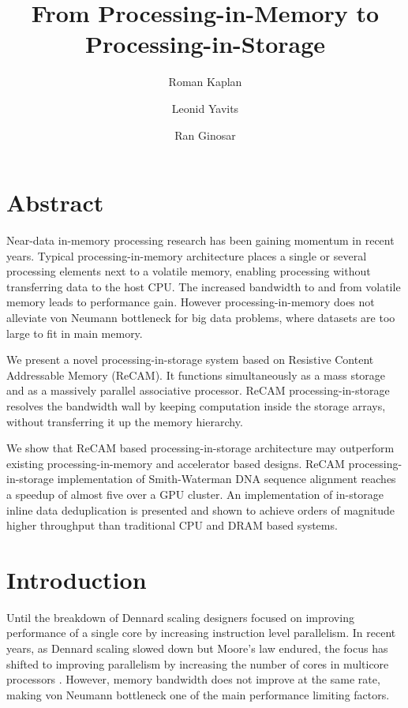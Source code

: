 \documentclass{superfri}
\begin{document}
	
	\title{From Processing-in-Memory to Processing-in-Storage}
	
	\author{Roman Kaplan\footnotemark \and Leonid Yavits\footnotemark[\value{footnote}] \and Ran Ginosar\footnotemark[\value{footnote}]}
	
	
	
	\maketitle{}
	
	\begin{abstract}
		
	\end{abstract}
	
	\section*{Abstract}
	\label{sec:abstract}
	Near-data in-memory processing research has been gaining momentum in recent years. Typical processing-in-memory architecture places a single or several processing elements next to a volatile memory, enabling processing without transferring data to the host CPU. The increased bandwidth to and from volatile memory leads to performance gain. However processing-in-memory does not alleviate von Neumann bottleneck for big data problems, where datasets are too large to fit in main memory. 
	
	We present a novel processing-in-storage system based on Resistive Content Addressable Memory (ReCAM). It functions simultaneously as a mass storage and as a massively parallel associative processor. ReCAM processing-in-storage resolves the bandwidth wall by keeping computation inside the storage arrays, without transferring it up the memory hierarchy. 
	
	We show that ReCAM based processing-in-storage architecture may outperform existing processing-in-memory and accelerator based designs. ReCAM processing-in-storage implementation of Smith-Waterman DNA sequence alignment reaches a speedup of almost five over a GPU cluster. An implementation of in-storage inline data deduplication is presented and shown to achieve orders of magnitude higher throughput than traditional CPU and DRAM based systems.
	
	\section{Introduction}
	\label{sec:motivation}
	Until the breakdown of Dennard scaling designers focused on improving performance of a single core by increasing instruction level parallelism. In recent years, as Dennard scaling slowed down but Moore's law endured, the focus has shifted to improving parallelism by increasing the number of cores in multicore processors \cite{esmaeilzadeh2011dark}. However, memory bandwidth does not improve at the same rate, making von Neumann bottleneck one of the main performance limiting factors.
	
\end{document}
